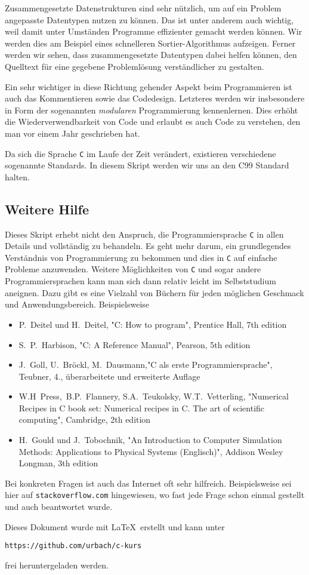 Zusammengesetzte Datenstrukturen sind sehr nützlich, um auf ein Problem angepasste Datentypen nutzen zu können.
Das ist unter anderem auch wichtig, weil damit unter Umständen Programme effizienter gemacht werden können.
Wir werden dies am Beispiel eines schnelleren Sortier-Algorithmus aufzeigen.
Ferner werden wir sehen, dass zusammengesetzte Datentypen dabei helfen können, den Quelltext für eine gegebene Problemlösung verständlicher zu gestalten.

Ein sehr wichtiger in diese Richtung gehender Aspekt beim Programmieren ist auch das Kommentieren sowie das Code\-design.
Letzteres werden wir insbesondere in Form der sogenannten \emph{modularen} Programmierung kennenlernen.
Dies erhöht die Wiederverwendbarkeit von Code und erlaubt es auch Code zu verstehen, den man vor einem Jahr geschrieben hat.

Da sich die Sprache \texttt{C} im Laufe der Zeit verändert, existieren verschiedene sogenannte Standards.
In diesem Skript werden wir uns an den C99 Standard halten.

\subsection{Weitere Hilfe}

Dieses Skript erhebt nicht den Anspruch, die Programmiersprache \texttt{C} in allen Details und vollständig zu behandeln.
Es geht mehr darum, ein grundlegendes Verständnis von Programmierung zu bekommen und dies in \texttt{C} auf einfache Probleme anzuwenden.
Weitere Möglichkeiten von \texttt{C} und sogar andere Programmiersprachen kann man sich dann relativ leicht im Selbststudium aneignen.
Dazu gibt es eine Vielzahl von Büchern für jeden möglichen Geschmack und Anwendungsbereich.
Beispielsweise
\begin{itemize}
\item P.~Deitel und H.~Deitel, "C: How to program", Prentice Hall, 7th edition
\item S.~P.~Harbison, "C: A Reference Manual", Pearson, 5th edition
\item J.~Goll, U.~Bröckl, M.~Dausmann,"C als erste Programmiersprache", Teubner, 4., überarbeitete und erweiterte Auflage
\item W.H~Press,~B.P.~Flannery, S.A.~Teukolsky, W.T.~Vetterling, "Numerical Recipes in C book set: Numerical recipes in C. The art of scientific computing", Cambridge, 2th edition
\item H.~Gould und J.~Tobochnik, "{}An Introduction to Computer Simulation Methods: Applications to Physical Systems (Englisch)", Addison Wesley Longman, 3th edition
\end{itemize}
Bei konkreten Fragen ist auch das Internet oft sehr hilfreich.
Beispielsweise sei hier auf \texttt{stackoverflow.com} hingewiesen, wo fast jede Frage schon einmal gestellt und auch beantwortet wurde.

Dieses Dokument wurde mit \LaTeX\ erstellt und kann unter 
\begin{center}
  \texttt{https://github.com/urbach/c-kurs} 
\end{center}
frei heruntergeladen werden.
